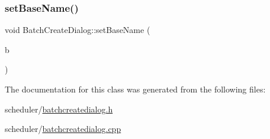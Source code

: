 \subsubsection{\texorpdfstring{setBaseName()}{setBaseName()}}
{\footnotesize\ttfamily void Batch\+Create\+Dialog\+::set\+Base\+Name (\begin{DoxyParamCaption}\item[{Q\+String}]{b }\end{DoxyParamCaption})}



The documentation for this class was generated from the following files\+:\begin{DoxyCompactItemize}
\item 
scheduler/\mbox{\hyperlink{batchcreatedialog_8h}{batchcreatedialog.\+h}}\item 
scheduler/\mbox{\hyperlink{batchcreatedialog_8cpp}{batchcreatedialog.\+cpp}}\end{DoxyCompactItemize}
